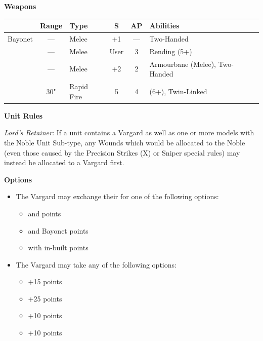 \begin{minipage}[t]{0.72\textwidth}
	\vspace*{2em}
	\textbf{Weapons}
	
	\begin{tabular}{L{90 pt} c C{40pt} *{2}{c} >{\raggedright\arraybackslash}p{130pt}}
		& Range & Type & S & AP & Abilities \\
		\hline
		Bayonet & — & Melee & +1 & — & Two-Handed \\
		 & — & Melee & User & 3 & Rending (5+) \\
		 & — & Melee & +2 & 2 & Armourbane (Melee), Two-Handed \\
		 & 30" & Rapid Fire & 5 & 4 &  (6+), Twin-Linked \\	
	\end{tabular}

	\vspace*{2em}
	\textbf{Unit Rules}
	
	\textit{Lord's Retainer:} If a unit contains a Vargard as well as one or more models with the Noble Unit Sub-type, any Wounds which would be allocated to the Noble (even those caused by the Precision Strikes (X) or Sniper special rules) may instead	be allocated to a Vargard first.

	\vspace*{2em}
	\textbf{Options}
	\begin{itemize}
		\item The Vargard may exchange their  for one of the following options:
		\begin{itemize}			
			\item {} and   points
			\item {} and Bayonet  points
			\item {} with in-built   points
		\end{itemize}
		\item The Vargard may take any of the following options:
		\begin{itemize}
			\item {} \dotfill +15 points
			\item {} \dotfill +25 points
			\item {} \dotfill +10 points
			\item {} \dotfill +10 points
		\end{itemize}
	\end{itemize}
\end{minipage}


